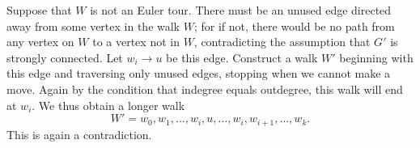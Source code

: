 \documentclass[12pt]{article}
\begin{document}
\begin{enumerate}[(a)]
{        Suppose that $W$ is not an Euler tour. 
        There must be an unused edge directed away from some vertex in the walk $W$; for if not, there would be no path from any vertex on $W$ to a vertex not in $W$, contradicting the assumption that $G'$ is strongly connected.  
        Let $w_i \to u$ be this edge. Construct a walk $W'$ beginning with this edge and traversing only unused edges, stopping when we cannot make a move. Again by the condition that indegree equals outdegree, this walk will end at $w_i$. We thus obtain a longer walk 
        \[ W' = w_0, w_1, \ldots, w_i, u, \ldots, w_i, w_{i+1}, \ldots, w_k. \]
        This is again a contradiction.

    }

\end{enumerate}
\end{document}
